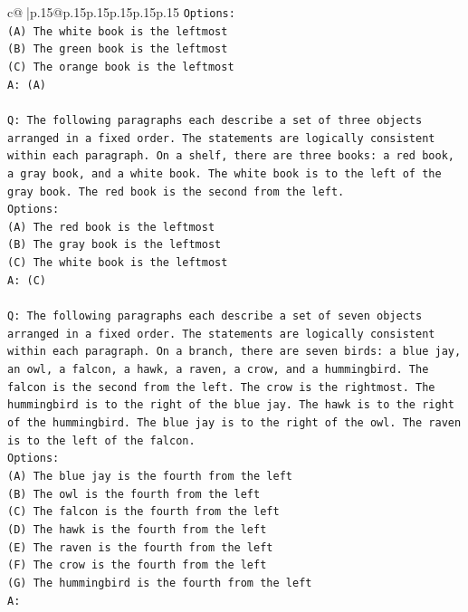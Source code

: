 \documentclass{article}
\begin{document}
{\begin{supertabular}{c@{$\;$}|p{.15\linewidth}@{}p{.15\linewidth}p{.15\linewidth}p{.15\linewidth}p{.15\linewidth}p{.15\linewidth}}
{{{\texttt{Options:} \\
\texttt{(A) The white book is the leftmost} \\
\texttt{(B) The green book is the leftmost} \\
\texttt{(C) The orange book is the leftmost} \\
\texttt{A: (A)} \\
\\ 
\texttt{Q: The following paragraphs each describe a set of three objects arranged in a fixed order. The statements are logically consistent within each paragraph. On a shelf, there are three books: a red book, a gray book, and a white book. The white book is to the left of the gray book. The red book is the second from the left.} \\
\texttt{Options:} \\
\texttt{(A) The red book is the leftmost} \\
\texttt{(B) The gray book is the leftmost} \\
\texttt{(C) The white book is the leftmost} \\
\texttt{A: (C)} \\
\\ 
\texttt{Q: The following paragraphs each describe a set of seven objects arranged in a fixed order. The statements are logically consistent within each paragraph. On a branch, there are seven birds: a blue jay, an owl, a falcon, a hawk, a raven, a crow, and a hummingbird. The falcon is the second from the left. The crow is the rightmost. The hummingbird is to the right of the blue jay. The hawk is to the right of the hummingbird. The blue jay is to the right of the owl. The raven is to the left of the falcon.} \\
\texttt{Options:} \\
\texttt{(A) The blue jay is the fourth from the left} \\
\texttt{(B) The owl is the fourth from the left} \\
\texttt{(C) The falcon is the fourth from the left} \\
\texttt{(D) The hawk is the fourth from the left} \\
\texttt{(E) The raven is the fourth from the left} \\
\texttt{(F) The crow is the fourth from the left} \\
\texttt{(G) The hummingbird is the fourth from the left} \\
\texttt{A:} \\
            }
        }
    }
     \\ \\


\end{supertabular}}
\end{document}
